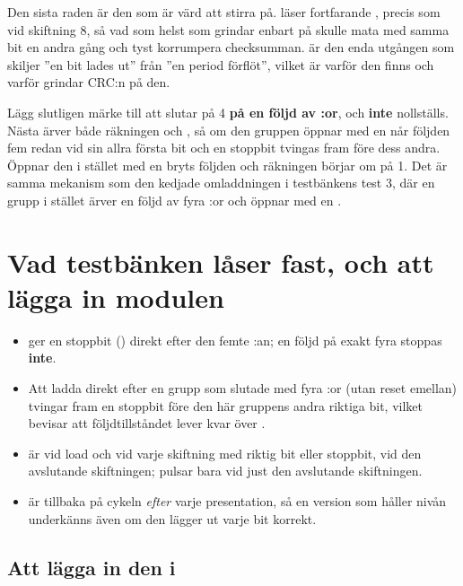 Den sista raden är den som är värd att stirra på.  läser fortfarande , precis
som vid skiftning 8, så vad som helst som grindar enbart på  skulle mata  med
samma bit en andra gång och tyst korrumpera checksumman.  är den enda utgången som
skiljer ”en bit lades ut” från ”en period förflöt”, vilket är varför den finns och varför
 grindar CRC:n på den.

Lägg slutligen märke till att  slutar på 4 \textbf{på en följd av :or},
och \textbf{inte} nollställs. Nästa  ärver både räkningen och , så om den
gruppen öppnar med en  når följden fem redan vid sin allra första bit och en stoppbit
tvingas fram före dess andra. Öppnar den i stället med en  bryts följden och räkningen
börjar om på 1. Det är samma mekanism som den kedjade omladdningen i testbänkens test 3, där en grupp
i stället ärver en följd av fyra :or och öppnar med en .

\section{Vad testbänken låser fast, och att lägga in modulen}
\label{c14:sec:tb}

\begin{itemize}
  \item {} ger en stoppbit () direkt efter den femte :an; en följd
    på exakt fyra stoppas \textbf{inte}.
  \item Att ladda  direkt efter en grupp som slutade med fyra :or (utan
    reset emellan) tvingar fram en stoppbit före den här gruppens andra riktiga bit, vilket bevisar
    att följdtillståndet lever kvar över .
  \item {} är  vid load och vid varje skiftning med riktig bit eller
    stoppbit,  vid den avslutande skiftningen;  pulsar bara vid just den
    avslutande skiftningen.
  \item {} är tillbaka på  cykeln \emph{efter} varje presentation, så en
    version som håller nivån underkänns även om den lägger ut varje bit korrekt.
\end{itemize}

\subsection{Att lägga in den i }
\label{c14:sub:wire}

